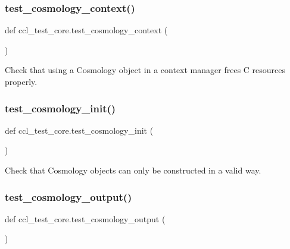 \subsubsection{\texorpdfstring{test\+\_\+cosmology\+\_\+context()}{test\_cosmology\_context()}}
{\footnotesize\ttfamily def ccl\+\_\+test\+\_\+core.\+test\+\_\+cosmology\+\_\+context (\begin{DoxyParamCaption}{ }\end{DoxyParamCaption})}

\begin{DoxyVerb}Check that using a Cosmology object in a context manager frees C resources properly.\end{DoxyVerb}
 \mbox{\label{namespaceccl__test__core_a4d2642cc4efaf3e38a2ba27fecc98abd}} 
\subsubsection{\texorpdfstring{test\+\_\+cosmology\+\_\+init()}{test\_cosmology\_init()}}
{\footnotesize\ttfamily def ccl\+\_\+test\+\_\+core.\+test\+\_\+cosmology\+\_\+init (\begin{DoxyParamCaption}{ }\end{DoxyParamCaption})}

\begin{DoxyVerb}Check that Cosmology objects can only be constructed in a valid way.
\end{DoxyVerb}
 \mbox{\label{namespaceccl__test__core_a7086ffc367c4c602cd12e67b76209a44}} 
\subsubsection{\texorpdfstring{test\+\_\+cosmology\+\_\+output()}{test\_cosmology\_output()}}
{\footnotesize\ttfamily def ccl\+\_\+test\+\_\+core.\+test\+\_\+cosmology\+\_\+output (\begin{DoxyParamCaption}{ }\end{DoxyParamCaption})}

